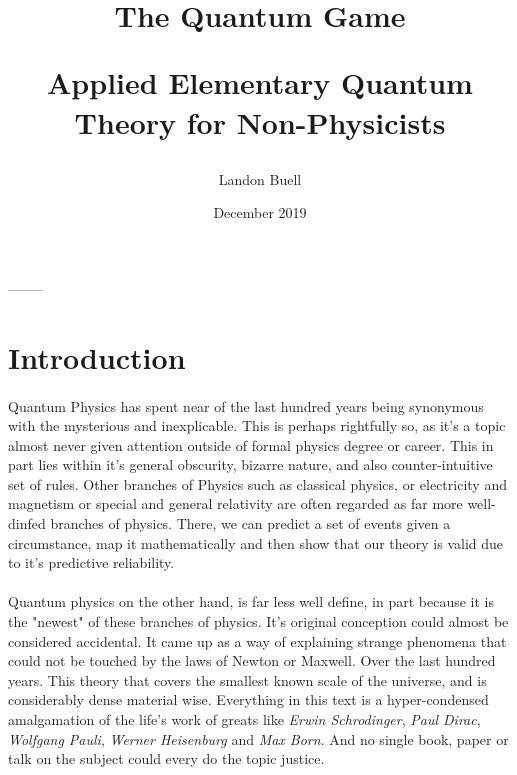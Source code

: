 \documentclass[12pt,letterpaper]{book}
\begin{document}

\title{
\begin{Huge}
The Quantum Game\\
\end{Huge}
\vspace*{5mm}
\Large Applied Elementary Quantum Theory for Non-Physicists}
\author{Landon Buell}
\date{December 2019}
\maketitle



\begin{center}
--------
\end{center}


\tableofcontents
\pagebreak


\section*{Introduction}
\paragraph*{}Quantum Physics has spent near of the last hundred years being synonymous with the mysterious and inexplicable. This is perhaps rightfully so, as it's a topic almost never given attention outside of formal physics degree or career. This in part lies within it's general obscurity, bizarre nature, and also counter-intuitive set of rules. Other branches of Physics such as classical physics, or electricity and magnetism or special and general relativity are often regarded as far more well-dinfed branches of physics. There, we can predict a set of events given a circumstance, map it mathematically and then show that our theory is valid due to it's predictive reliability.
\paragraph*{}Quantum physics on the other hand, is far less well define, in part because it is the "newest" of these branches of physics. It's original conception could almost be considered accidental. It came up as a way of explaining strange phenomena that could not be touched by the laws of Newton or Maxwell. Over the last hundred years. This theory that covers the smallest known scale of the universe, and is considerably dense material wise. Everything in this text is a hyper-condensed amalgamation of the life's work of greats like \textit{Erwin Schrodinger}, \textit{Paul Dirac}, \textit{Wolfgang Pauli}, \textit{Werner Heisenburg} and \textit{Max Born}. And no single book, paper or talk on the subject could every do the topic justice.
\end{document}
